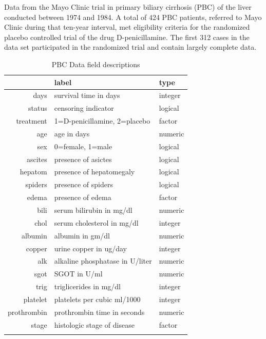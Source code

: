 \documentclass[nojss]{jss}\usepackage[]{graphicx}\usepackage[]{color}
\begin{document}
Data from the Mayo Clinic trial in primary biliary cirrhosis (PBC) of the liver conducted between 1974 and 1984. A total of 424 PBC patients, referred to Mayo Clinic during that ten-year interval, met eligibility criteria for the randomized placebo controlled trial of the drug D-penicillamine. The first 312 cases in the data set participated in the randomized trial and contain largely complete data.



\begin{table}[ht]
\centering
{\footnotesize
\begin{tabular}{rll}
  \toprule
 & label & type \\ 
  \midrule
days & survival time in days & integer \\ 
   \rowcolor[gray]{0.95}status & censoring indicator & logical \\ 
  treatment & 1=D-penicillamine, 2=placebo & factor \\ 
   \rowcolor[gray]{0.95}age & age in days & numeric \\ 
  sex & 0=female, 1=male & logical \\ 
   \rowcolor[gray]{0.95}ascites & presence of asictes & logical \\ 
  hepatom & presence of hepatomegaly & logical \\ 
   \rowcolor[gray]{0.95}spiders & presence of spiders & logical \\ 
  edema & presence of edema & factor \\ 
   \rowcolor[gray]{0.95}bili & serum bilirubin in mg/dl & numeric \\ 
  chol & serum cholesterol in mg/dl & integer \\ 
   \rowcolor[gray]{0.95}albumin & albumin in gm/dl & numeric \\ 
  copper & urine copper in ug/day & integer \\ 
   \rowcolor[gray]{0.95}alk & alkaline phosphatase in U/liter & numeric \\ 
  sgot & SGOT in U/ml & numeric \\ 
   \rowcolor[gray]{0.95}trig & triglicerides in mg/dl & integer \\ 
  platelet & platelets per cubic ml/1000 & integer \\ 
   \rowcolor[gray]{0.95}prothrombin & prothrombin time in seconds & numeric \\ 
  stage & histologic stage of disease & factor \\ 
   \rowcolor[gray]{0.95} \bottomrule
\end{tabular}
}
\caption{PBC Data field descriptions} 
\label{T:dataLabs}
\end{table}
\end{document}
